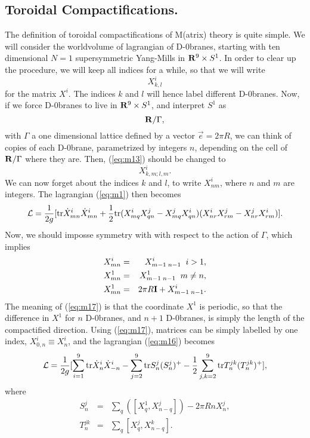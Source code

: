 \subsection{Toroidal Compactifications.}

The definition of toroidal compactifications \cite{toroidal} of M(atrix) theory is quite 
simple. We will consider the worldvolume of lagrangian of D-$0$branes, starting 
with ten dimensional $N=1$ supersymmetric Yang-Mills in ${\bf R}^9 \times S^1$. 
In order to clear up the procedure, we will keep all indices for a while, 
so that we will write 
\begin{equation}
X^{i}_{k,l} 
\label{eq:m13}
\end{equation}
for the matrix $X^{i}$. The indices $k$ and $l$ will hence label different 
D-$0$branes. Now, if we force D-$0$branes to live in ${\bf R}^9 \times S^1$, 
and interpret $S^1$ as
\begin{equation}
{\bf R}/\Gamma,
\label{eq:m14}
\end{equation}
with $\Gamma$ a one dimensional lattice defined by a vector $\vec{e}= 
2 \pi R$, we can think of copies of each D-$0$brane, parametrized by 
integers $n$, depending on the cell of ${\bf R}/\Gamma$ where they are. Then, 
(\ref{eq:m13}) should be changed to
\begin{equation}
X^{i}_{k,m;l,m}.
\label{eq:m15}
\end{equation}
We can now forget about the indices $k$ and $l$, to write $X^{i}_{n m}$, where 
$n$ and $m$ are integers. The lagrangian (\ref{eq:m1}) then becomes
\begin{equation}
{\cal L} = \frac {1}{2g} [ \hbox {tr} \dot{X}^{i}_{mn} \dot{X}^{i}_{mn} + 
\frac {1}{2} \hbox {tr}(X^{i}_{mq} X^j_{qn} - X^{j}_{mq} X^{i}_{qn} )
(X^{i}_{nr} X^j_{rm} - X^{j}_{nr} X^{i}_{rm} )].
\label{eq:m16}
\end{equation}
Now, we should imposse symmetry with with respect to the action
of $\Gamma$, which implies
\begin{eqnarray}
X^{i}_{mn} & = & X^{i}_{m-1 \; n-1} \; \; i>1, \nonumber \\
X^{1}_{mn} & = & X^{1}_{m-1 \; n-1} \; \; m \neq n, \nonumber \\
X^{1}_{mn} & = & 2 \pi R {\bf I} + X^{i}_{m-1 \; n-1}.
\label{eq:m17}
\end{eqnarray}
The meaning of (\ref{eq:m17}) is that the coordinate $X^1$ is
periodic, so that the difference in $X^1$ for $n$ D-$0$branes,
and $n+1$ D-$0$branes, is simply the length of the compactified
direction. Using (\ref{eq:m17}), matrices can be simply labelled
by one index, $X^{i}_{0,n} \equiv X^{i}_n$, and the lagrangian
(\ref{eq:m16}) becomes
\begin{equation}
{\cal L} = \frac {1}{2g} [ \sum_{i=1}^{9} \hbox {tr}
\dot{X}^{i}_n \dot{X}^{i}_{-n}- \sum_{j=2}^9 \hbox {tr} S^{j}_n
(S^j_n)^+- \frac {1}{2} \sum_{j,k=2} ^9 \hbox {tr} T^{jk}_n
(T^{jk}_n)^+],
\label{eq:m18}
\end{equation}
where 
\begin{eqnarray}
S^j_n & = & \sum_q ([X^1_q,X^j_{n-q}])- 2 \pi R n X^j_n,
\nonumber \\
T^{jk}_n & = & \sum_q [X^j_q,X^k_{n-q}].
\label{eq:m19}
\end{eqnarray}
  
